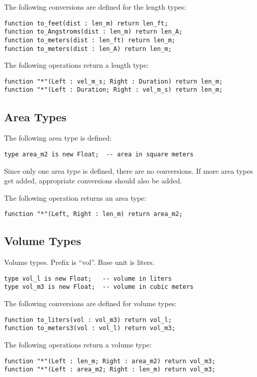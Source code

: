 \documentclass[10pt, openany]{book}
\begin{document}
The following conversions are defined for the length types:
\begin{lstlisting}
function to_feet(dist : len_m) return len_ft;
function to_Angstroms(dist : len_m) return len_A;
function to_meters(dist : len_ft) return len_m;
function to_meters(dist : len_A) return len_m;
\end{lstlisting}

The following operations return a length type:
\begin{lstlisting}
function "*"(Left : vel_m_s; Right : Duration) return len_m;
function "*"(Left : Duration; Right : vel_m_s) return len_m;
\end{lstlisting}

\subsection{Area Types}
The following area type is defined:
\begin{lstlisting}
type area_m2 is new Float;  -- area in square meters
\end{lstlisting}

Since only one area type is defined, there are no conversions.  If more area types get added, appropriate conversions should also be added.

The following operation returns an area type:
\begin{lstlisting}
function "*"(Left, Right : len_m) return area_m2;
\end{lstlisting}

\subsection{Volume Types}
Volume types.  Prefix is ``vol''.  Base unit is liters.
\begin{lstlisting}
type vol_l is new Float;   -- volume in liters
type vol_m3 is new Float;  -- volume in cubic meters
\end{lstlisting}

The following conversions are defined for volume types:
\begin{lstlisting}
function to_liters(vol : vol_m3) return vol_l;
function to_meters3(vol : vol_l) return vol_m3;
\end{lstlisting}

The following operations return a volume type:
\begin{lstlisting}
function "*"(Left : len_m; Right : area_m2) return vol_m3;
function "*"(Left : area_m2; Right : len_m) return vol_m3;
\end{lstlisting}
\end{document}
